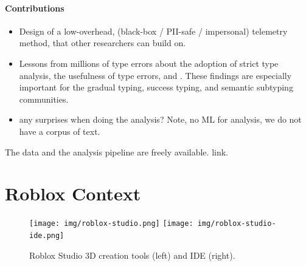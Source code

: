 \documentclass[english,submission,cleveref]{programming}
\begin{document}
\paragraph{Contributions}
\begin{itemize}
  \item
    Design of a low-overhead, (black-box / PII-safe / impersonal)
    telemetry method, that other
    researchers can build on.

  \item
    Lessons from millions of type errors about
    the adoption of strict type analysis,
    the usefulness of type errors,
    and \FILL{}.
    These findings are especially important for the
    gradual typing, success typing, and semantic subtyping communities.

  \item
    \FILL{} any surprises when doing the analysis?
    Note, no ML for analysis, we do not have a corpus of text.

\end{itemize}

The data and the analysis pipeline are freely available.
\FILL{} link.


\section{{Roblox} Context}
\label{s:context}

% 
% 

\begin{figure}[t]\centering
  \texttt{[image: img/roblox-studio.png]}
  \texttt{[image: img/roblox-studio-ide.png]}

  \caption{{Roblox Studio 3D creation} tools (left) and IDE (right).}
  \label{fig:roblox-studio}
\end{figure}

\end{document}
